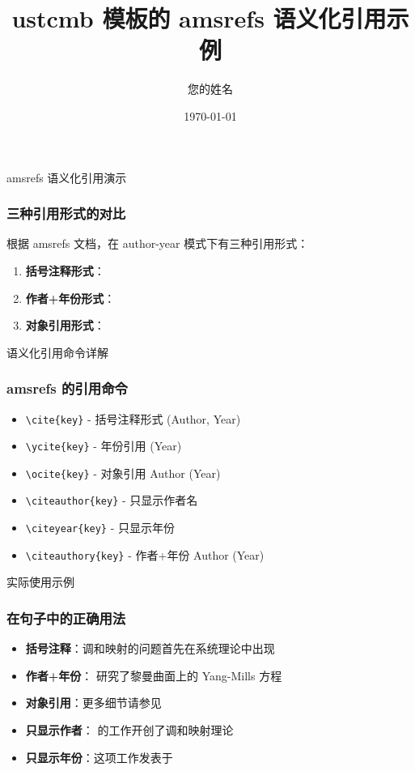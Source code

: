 \documentclass[authoryear,zh]{ustcmb}
\title[ustcmb amsrefs示例]{ustcmb 模板的 amsrefs 语义化引用示例}
\author[作者]{您的姓名}
\institute[机构]{您的机构}
\date{\today}
\begin{document}
\frame{\titlepage}

\begin{frame}{amsrefs 语义化引用演示}
  \frametitle{三种引用形式的对比}
  
  根据 amsrefs 文档，在 author-year 模式下有三种引用形式：
  
  \begin{enumerate}
    \item \textbf{括号注释形式}：\cite{SibnerSibnerUhlenbeck1989Solutions}
    \item \textbf{作者+年份形式}：\citeauthor{AtiyahBott1983Yang} 
    \item \textbf{对象引用形式}：
  \end{enumerate}
\end{frame}

\begin{frame}{语义化引用命令详解}
  \frametitle{amsrefs 的引用命令}
  
  \begin{itemize}
    \item \texttt{\textbackslash cite\{key\}} - 括号注释形式 (Author, Year)
    \item \texttt{\textbackslash ycite\{key\}} - 年份引用 (Year)
    \item \texttt{\textbackslash ocite\{key\}} - 对象引用 Author (Year)
    \item \texttt{\textbackslash citeauthor\{key\}} - 只显示作者名
    \item \texttt{\textbackslash citeyear\{key\}} - 只显示年份
    \item \texttt{\textbackslash citeauthory\{key\}} - 作者+年份 Author (Year)
  \end{itemize}
\end{frame}

\begin{frame}{实际使用示例}
  \frametitle{在句子中的正确用法}
  
  \begin{itemize}
    \item \textbf{括号注释}：调和映射的问题首先在系统理论中出现 \cite{EellsSampson1964Harmonic}
    
    \item \textbf{作者+年份}：\citeauthor{AtiyahBott1983Yang}  研究了黎曼曲面上的 Yang-Mills 方程
    
    \item \textbf{对象引用}：更多细节请参见 
    
    \item \textbf{只显示作者}：\citeauthor{EellsSampson1964Harmonic} 的工作开创了调和映射理论
    
    \item \textbf{只显示年份}：这项工作发表于 \citeyear{AtiyahBott1983Yang}
  \end{itemize}
\end{frame}
\end{document}
